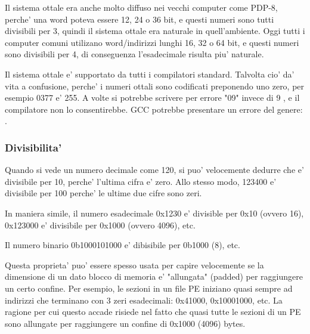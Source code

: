 Il sistema ottale era anche molto diffuso nei vecchi computer come PDP-8, perche' una word poteva essere 12, 24 o 36 bit, e questi numeri sono tutti divisibili per 3, quindi il sistema ottale era naturale in quell'ambiente.
Oggi tutti i computer comuni utilizano word/indirizzi lunghi 16, 32 o 64 bit, e questi numeri sono divisibili per 4, di conseguenza l'esadecimale risulta piu' naturale.

Il sistema ottale e' supportato da tutti i compilatori \CCpp standard.
Talvolta cio' da' vita a confusione, perche' i numeri ottali sono codificati preponendo uno zero, per esempio 0377 e' 255.
A volte si potrebbe scrivere per errore "09" invece di 9 , e il compilatore non lo consentirebbe.
GCC potrebbe presentare un errore del genere:\\
.

\subsubsection{Divisibilita'}

Quando si vede un numero decimale come 120, si puo' velocemente dedurre che e' divisibile per 10, perche' l'ultima cifra e' zero.
Allo stesso modo, 123400 e' divisibile per 100 perche' le ultime due cifre sono zeri.


In maniera simile, il numero esadecimale 0x1230 e' divisible per 0x10 (ovvero 16), 0x123000 e' divisibile per 0x1000 (ovvero 4096), etc.

Il numero binario 0b1000101000 e' dibisibile per 0b1000 (8), etc.

Questa proprieta' puo' essere spesso usata per capire velocemente se la dimensione di un dato blocco di memoria e' "allungata" (padded) per raggiungere un certo confine.
Per esempio, le sezioni in un file \ac{PE} iniziano quasi sempre ad indirizzi che terminano con 3 zeri esadecimali: 0x41000, 0x10001000, etc.
La ragione per cui questo accade risiede nel fatto che quasi tutte le sezioni di un \ac{PE} sono allungate per raggiungere un confine di 0x1000 (4096) bytes.
